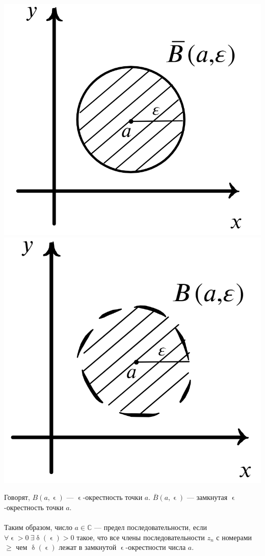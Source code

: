\documentclass[a4paper, 12pt]{article}
\newcommand{\Cm}{\mathbb{C}}
\renewcommand{\delta}{\updelta}
\renewcommand{\epsilon}{\upvarepsilon}
\newcommand{\limdef}{\forall \epsilon >0\ \exists \delta (\epsilon) > 0}
\begin{document}
\begin{center}
	\includegraphics[scale=0.4]{images/010.png}\qquad\qquad\qquad\qquad
	\includegraphics[scale=0.4]{images/011.png}
\end{center}
\noindent
\parbox[b][4.5cm][t]{95mm}{
	Говорят, $B(a,\epsilon)$ --- $\epsilon$-окрестность точки $a$. $\overline{B}(a,\epsilon)$ --- замкнутая $\epsilon$-окрестность точки $a$.\\\\
	Таким образом, число $a\in \Cm$ --- предел последовательности, если $\limdef$ такое, что все члены последовательности $z_n$ с номерами $\geqslant$ чем $\delta (\epsilon)$ лежат в замкнутой $\epsilon$-окрестности числа $a$.\\\\
}
\end{document}
